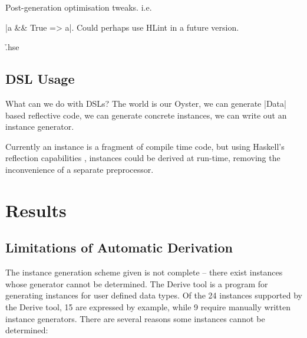 \documentclass[preprint,draft]{sigplanconf}
\begin{document}
Post-generation optimisation tweaks. i.e. \ignore|a && True => a|. Could perhaps use HLint in a future version.

\h{.hse}

\subsection{DSL Usage}

What can we do with DSLs? The world is our Oyster, we can generate |Data| based reflective code, we can generate concrete instances, we can write out an instance generator.

Currently an instance is a fragment of compile time code, but using Haskell's reflection capabilities \cite{lammel:syb2}, instances could be derived at run-time, removing the inconvenience of a separate preprocessor.

\section{Results}
\label{sec:results}

\subsection{Limitations of Automatic Derivation}
\label{sec:failure}

The instance generation scheme given is not complete -- there exist instances whose generator cannot be determined. The Derive tool \cite{derive} is a program for generating instances for user defined data types. Of the 24 instances supported by the Derive tool, 15 are expressed by example, while 9 require manually written instance generators. There are several reasons some instances cannot be determined:
\end{document}
